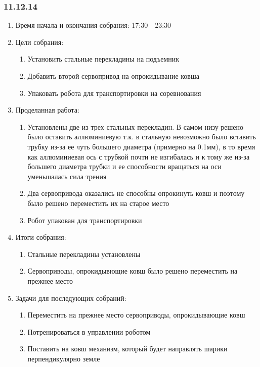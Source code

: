 \subsubsection{11.12.14}

\begin{enumerate}
	\item Время начала и окончания собрания: 17:30 - 23:30
	\item Цели собрания:
	\begin{enumerate}
		\item Установить стальные перекладины на подъемник
		
		\item Добавить второй сервопривод на опрокидывание ковша
		
		\item Упаковать робота для транспортировки на соревнования
	\end{enumerate}
	\item Проделанная работа:
	\begin{enumerate}
		\item Установлены две из трех стальных перекладин. В самом низу решено было оставить аллюминиевую т.к. в стальную невозможно было вставить трубку из-за ее чуть большего диаметра (примерно на 0.1мм), в то время как аллюминиевая ось с трубкой почти не изгибалась и к тому же из-за большего диаметра трубки и ее способности вращаться на оси уменьшалась сила трения
		
		\item Два сервопривода оказались не способны опрокинуть ковш и поэтому было решено переместить их на старое место
		
		\item Робот упакован для транспортировки
		
	\end{enumerate}
	\item Итоги собрания:
	\begin{enumerate}
		\item Стальные перекладины установлены
		
		\item Сервоприводы, опрокидывющие ковш было решено переместить на прежнее место
		
	\end{enumerate}
	\item Задачи для последующих собраний:
	\begin{enumerate}	
		\item Переместить на прежнее место сервоприводы, опрокидывающие ковш
		
		\item Потренироваться в управлении роботом
		
		\item Поставить на ковш механизм, который будет направлять шарики перпендикулярно земле
		
	\end{enumerate}
\end{enumerate}